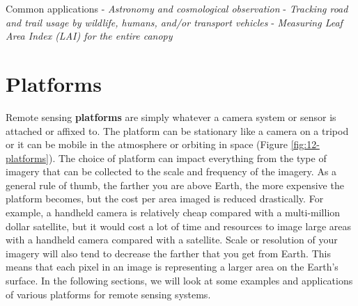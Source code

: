 \documentclass[
]{book}
\begin{document}
Common applications
- \emph{Astronomy and cosmological observation}
- \emph{Tracking road and trail usage by wildlife, humans, and/or transport vehicles}
- \emph{Measuring Leaf Area Index (LAI) for the entire canopy}

\hypertarget{platforms}{%
\section{Platforms}\label{platforms}}

Remote sensing \textbf{platforms} are simply whatever a camera system or sensor is attached or affixed to. The platform can be stationary like a camera on a tripod or it can be mobile in the atmosphere or orbiting in space (Figure \ref{fig:12-platforms}). The choice of platform can impact everything from the type of imagery that can be collected to the scale and frequency of the imagery. As a general rule of thumb, the farther you are above Earth, the more expensive the platform becomes, but the cost per area imaged is reduced drastically. For example, a handheld camera is relatively cheap compared with a multi-million dollar satellite, but it would cost a lot of time and resources to image large areas with a handheld camera compared with a satellite. Scale or resolution of your imagery will also tend to decrease the farther that you get from Earth. This means that each pixel in an image is representing a larger area on the Earth's surface. In the following sections, we will look at some examples and applications of various platforms for remote sensing systems.
\end{document}
